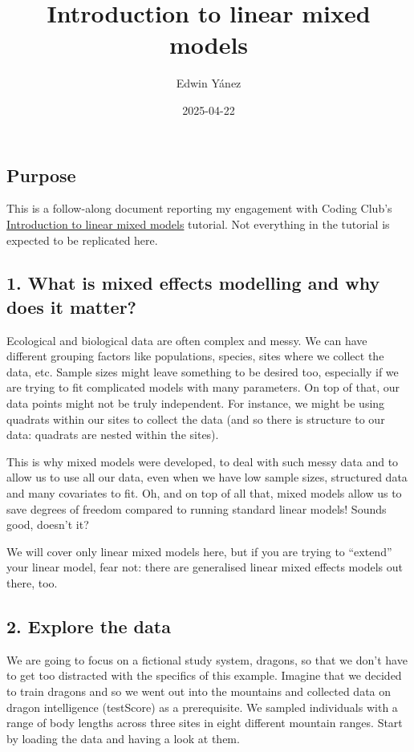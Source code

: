 \documentclass[
]{article}
\title{Introduction to linear mixed models}
\author{Edwin Yánez}
\date{2025-04-22}
\begin{document}
\maketitle

{
\setcounter{tocdepth}{4}
\tableofcontents
}
\subsection{Purpose}\label{purpose}

This is a follow-along document reporting my engagement with Coding
Club's
\href{https://ourcodingclub.github.io/tutorials/mixed-models/index.html}{Introduction
to linear mixed models} tutorial. Not everything in the tutorial is
expected to be replicated here.

\subsection{1. What is mixed effects modelling and why does it
matter?}\label{what-is-mixed-effects-modelling-and-why-does-it-matter}

Ecological and biological data are often complex and messy. We can have
different grouping factors like populations, species, sites where we
collect the data, etc. Sample sizes might leave something to be desired
too, especially if we are trying to fit complicated models with many
parameters. On top of that, our data points might not be truly
independent. For instance, we might be using quadrats within our sites
to collect the data (and so there is structure to our data: quadrats are
nested within the sites).

This is why mixed models were developed, to deal with such messy data
and to allow us to use all our data, even when we have low sample sizes,
structured data and many covariates to fit. Oh, and on top of all that,
mixed models allow us to save degrees of freedom compared to running
standard linear models! Sounds good, doesn't it?

We will cover only linear mixed models here, but if you are trying to
``extend'' your linear model, fear not: there are generalised linear
mixed effects models out there, too.

\subsection{2. Explore the data}\label{explore-the-data}

We are going to focus on a fictional study system, dragons, so that we
don't have to get too distracted with the specifics of this example.
Imagine that we decided to train dragons and so we went out into the
mountains and collected data on dragon intelligence (testScore) as a
prerequisite. We sampled individuals with a range of body lengths across
three sites in eight different mountain ranges. Start by loading the
data and having a look at them.
\end{document}
